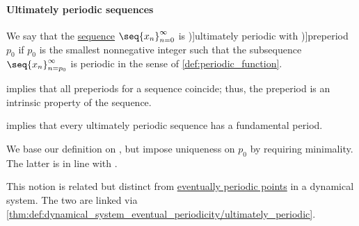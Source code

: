 \paragraph{Ultimately periodic sequences}

\begin{definition}\label{def:ultimately_periodic_sequence}\mimprovised
  We say that the \hyperref[def:sequence]{sequence} \( \seq{ x_n }_{n=0}^\infty \) is \term[en=ultimately periodic (\cite[def. 8.3]{LidlNiederreiter1997FiniteFields})]{ultimately periodic} with \term[en=preperiod (\cite[412]{LidlNiederreiter1997FiniteFields})]{preperiod} \( p_0 \) if \( p_0 \) is the smallest nonnegative integer such that the subsequence \( \seq{ x_n }_{n=p_0}^\infty \) is periodic in the sense of \cref{def:periodic_function}.
\end{definition}
\begin{comments}
  \item {} implies that all preperiods for a sequence coincide; thus, the preperiod is an intrinsic property of the sequence.

  \item {} implies that every ultimately periodic sequence has a fundamental period.

  \item We base our definition on , but impose uniqueness on \( p_0 \) by requiring minimality. The latter is in line with .

  \item This notion is related but distinct from \hyperref[def:dynamical_system_eventual_periodicity]{eventually periodic points} in a dynamical system. The two are linked via \cref{thm:def:dynamical_system_eventual_periodicity/ultimately_periodic}.
\end{comments}

